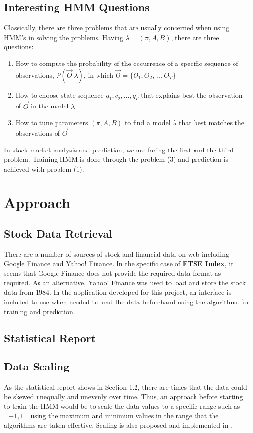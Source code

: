 \documentclass{acm_proc_article-sp}
\begin{document}
\subsection{Interesting HMM Questions} \label{sec:hmm_probs}
Classically, there are three problems that are usually concerned when using HMM's in solving the problems. Having
$\lambda = (\pi, A, B)$, there are three questions:
\begin{enumerate}
  \item How to compute the probability of the occurrence of a specific sequence of observations, $P(\vec{O}|\lambda)$,
  in which $\vec{O} = \{O_1, O_2, \ldots, O_T\}$
  \item How to choose state sequence $q_1, q_2, \ldots, q_T$ that explains best the observation of $\vec{O}$ in the
  model $\lambda$.
  \item How to tune parameters $(\pi, A, B)$ to find a model $\lambda$ that best matches the observations of $\vec{O}$
\end{enumerate}

In stock market analysis and prediction, we are facing the first and the third problem. Training HMM is done through
the problem (3) and prediction is achieved with problem (1).

\section{Approach} \label{sec:approach}

\subsection{Stock Data Retrieval} \label{sec:data} 
There are a number of sources of stock and financial data on web including Google Finance and Yahoo! Finance. In the
specific case of \textbf{FTSE Index}, it seems that Google Finance does not provide the required data format as
required. As an alternative, Yahoo! Finance was used to load and store the stock data from 1984. In the application
developed for this project, an interface is included to use when needed to load the data beforehand using the
algorithms for training and prediction.

\subsection{Statistical Report} \label{sec:stats}

\subsection{Data Scaling} \label{sec:scale}
As the statistical report shows in Section \ref{sec:stats}, there are times that the data could be skewed unequally and
unevenly over time. Thus, an approach before starting to train the HMM would be to scale the data values to a specific
range such as $[-1, 1]$ using the maximum and minimum values in the range that the algorithms are taken effective.
Scaling is also proposed and implemented in \cite{hassan:hmm_stock_fuzzy}.
\end{document}
